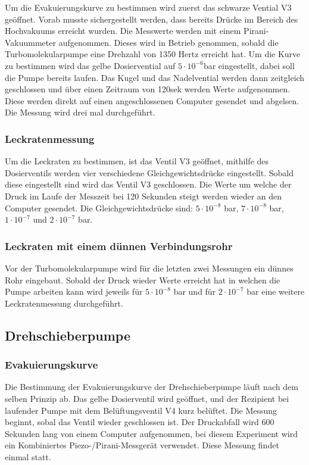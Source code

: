 Um die Evakuierungskurve zu bestimmen wird zuerst das schwarze Vential V3 geöffnet.
Vorab musste sichergestellt werden, dass bereits Drücke im Bereich des Hochvakuums erreicht wurden.
Die Messwerte werden  mit einem Pirani-Vakuummeter aufgenommen.
Dieses wird in Betrieb genommen, sobald die Turbomolekularpumpe eine Drehzahl von 1350 Hertz erreicht hat.
Um die Kurve zu bestimmen wird das gelbe Dosiervential auf $5\cdot 10^{-6}$bar eingestellt, dabei soll die Pumpe bereits laufen.
Das Kugel und das Nadelvential werden dann zeitgleich geschlossen und über einen Zeitraum von 120sek werden Werte
aufgenommen. Diese werden direkt auf einen angeschlossenen Computer gesendet und abgelsen.
Die Messung wird drei mal durchgeführt. 

\subsubsection{Leckratenmessung}
Um die Leckraten zu bestimmen, ist das Ventil V3 geöffnet, mithilfe des Dosierventils werden vier verschiedene 
Gleichgewichtsdrücke eingestellt. Sobald diese eingestellt sind wird das Ventil V3 geschlossen. Die Werte um welche der Druck
im Laufe der Messzeit bei 120 Sekunden steigt werden wieder an den Computer gesendet. Die Gleichgewichtsdrücke sind:
$5\cdot 10^{-8}$ bar, $7\cdot 10^{-8}$ bar, $1\cdot 10^{-7}$ und $2\cdot 10^{-7}$ bar.

\subsubsection{Leckraten mit einem dünnen Verbindungsrohr}
Vor der Turbomolekularpumpe wird für die letzten zwei Messungen ein dünnes Rohr eingebaut. Sobald der Druck wieder Werte erreicht hat in 
welchen die Pumpe arbeiten kann wird jeweils für $5\cdot 10^{-8}$ bar und für $2\cdot 10^{-7}$ bar eine weitere Leckratenmessung durchgeführt.


\subsection{Drehschieberpumpe}
\subsubsection{Evakuierungskurve}

Die Bestimmung der Evakuierungskurve der Drehschieberpumpe läuft nach dem selben Prinzip ab. Das gelbe Dosierventil wird geöffnet,
und der Rezipient bei laufender Pumpe mit dem Belüftungsventil V4 kurz belüftet. Die Messung beginnt, sobal das Ventil wieder geschlossen
ist. Der Druckabfall wird 600 Sekunden lang von einem Computer aufgenommen, bei diesem Experiment wird ein Kombiniertes Piezo-/Pirani-Messgerät
verwendet. Diese Messung findet einmal statt.

